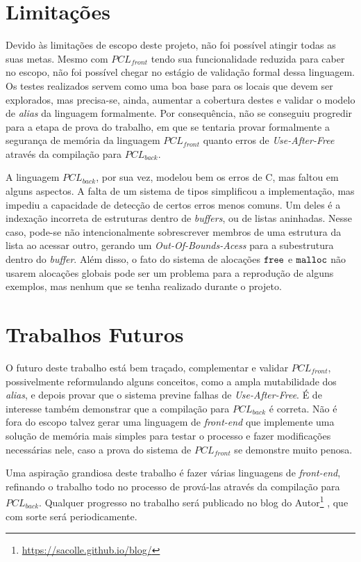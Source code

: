 \section{Limitações}

Devido às limitações de escopo deste projeto, não foi possível atingir todas as suas metas. Mesmo com $PCL_{front}$ tendo sua funcionalidade reduzida para caber no escopo, não foi possível chegar no estágio de validação formal dessa linguagem. Os testes realizados servem como uma boa base para os locais que devem ser explorados, mas precisa-se, ainda, aumentar a cobertura destes e validar o modelo de \emph{alias} da linguagem formalmente. Por consequência, não se conseguiu progredir para a etapa de prova do trabalho, em que se tentaria provar formalmente a segurança de memória da linguagem $PCL_{front}$ quanto erros de \emph{Use-After-Free} através da compilação para $PCL_{back}$.

A linguagem $PCL_{back}$, por sua vez, modelou bem os erros de C, mas faltou em alguns aspectos. A falta de um sistema de tipos simplificou a implementação, mas impediu a capacidade de detecção de certos erros menos comuns. Um deles é a indexação incorreta de estruturas dentro de \emph{buffers}, ou de listas aninhadas. Nesse caso, pode-se não intencionalmente sobrescrever membros de uma estrutura da lista ao acessar outro, gerando um \emph{Out-Of-Bounds-Acess} para a subestrutura dentro do \emph{buffer}. Além disso, o fato do sistema de alocações $\texttt{free}$ e $\texttt{malloc}$ não usarem alocações globais pode ser um problema para a reprodução de alguns exemplos, mas nenhum que se tenha realizado durante o projeto.

\section{Trabalhos Futuros}

O futuro deste trabalho está bem traçado, complementar e validar $PCL_{front}$, possivelmente reformulando alguns conceitos, como a ampla mutabilidade dos \emph{alias}, e depois provar que o sistema previne falhas de \emph{Use-After-Free}. É de interesse também demonstrar que a compilação para $PCL_{back}$ é correta. Não é fora do escopo talvez gerar uma linguagem de \emph{front-end} que implemente uma solução de memória mais simples para testar o processo e fazer modificações necessárias nele, caso a prova do sistema de $PCL_{front}$ se demonstre muito penosa.

Uma aspiração grandiosa deste trabalho é fazer várias linguagens de \emph{front-end}, refinando o trabalho todo no processo de prová-las através da compilação para $PCL_{back}$. Qualquer progresso no trabalho será publicado no blog do Autor\footnote{\url{https://sacolle.github.io/blog/}} , que com sorte será periodicamente. 